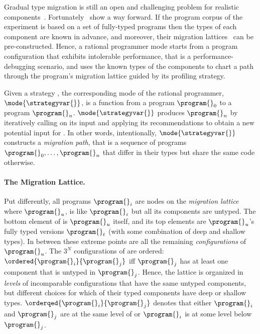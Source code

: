 
Gradual type migration is still an open and challenging problem for realistic
components~\cite{rch:in-out-infer-gt, mp:gt-decidable, ccew:gt-migrate,
msi:gt-infer-hm, gc:gt-infer, cagg-solver-based-migration, km:ts-type-evo}.
Fortunately~\citep{lgfd-icfp-2021} show a way forward. If the program corpus of
the experiment is based on a set of fully-typed programs then the types of each
component are known in advance, and moreover, their migration
lattices~\citep{tfgnvf-popl-2016} can be pre-constructed.  Hence, a rational
programmer mode starts from a program configuration that exhibits intolerable
performance, that is a performance-debugging scenario, and uses the known types
of the components to chart a path through the program's migration lattice guided
by its profiling strategy.

Given a strategy \strategyvar{}, the corresponding mode of the rational
programmer, $\mode{\strategyvar{}}$, is a function from a program $\program{}_0$
to a program $\program{}_n$. $\mode{\strategyvar{}}$ produces $\program{}_n$ by
iteratively calling \strategyvar{} on its input and applying its recommendations
to obtain a new potential input for \strategyvar{}.  In other words,
intentionally, $\mode{\strategyvar{}}$ constructs a \emph{migration path}, that
is a sequence of programs ${\program{}_0}, \ldots, {\program{}_n}$ that differ in
their types but share the same code otherwise.

\paragraph{The Migration Lattice.}
Put differently, all programs $\program{}_i$ are nodes on the
\emph{migration lattice}  where ${\program{}_u}$, is
like ${\program{}_i}$ but all its components are untyped. The bottom
element of  is ${\program{}_u}$ itself, and its top
elements are ${\program{}_u}$'s fully typed versions $\program{}_t$ (with some
combination of deep and shallow types). In between these extreme points
are all the remaining \emph{configurations} of $\program{}_u$. The $3^N$
configurations of   are ordered:
$\ordered{\program{}_i}{\program{}_j}$ iff $\program{}_j$ has at least one
component that is untyped in $\program{}_j$. Hence, the lattice is
organized in \emph{levels} of incomparable configurations that have the same
untyped components, but different choices for which of their typed
components have deep or shallow types.
$\orderqed{\program{}_i}{\program{}_j}$ denotes that either $\program{}_i$
and $\program{}_j$ are at the same level of  or
$\program{}_i$ is at some level below $\program{}_j$.

